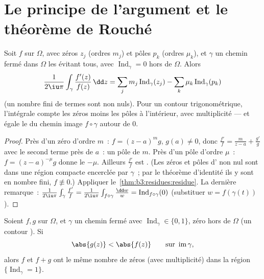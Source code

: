 \section{Le principe de l'argument et le théorème de Rouché}

\begin{theorem}
\label{thm:b3:residues:argument}
Soit $f$  sur $\Omega$, avec zéros $z_j$ (ordres
$m_j$) et pôles $p_k$ (ordres $\mu_k$), et $\gamma$ un chemin
fermé dans $\Omega$ les évitant tous, avec
$\operatorname{Ind}_\gamma = 0$ hors de $\Omega$. Alors
\[
\frac1{2\iu\pi}\int_\gamma\frac{f'(z)}{f(z)}\,\dd z
= \sum_j m_j\operatorname{Ind}_\gamma(z_j)
- \sum_k \mu_k\operatorname{Ind}_\gamma(p_k)
\]
(un nombre fini de termes sont non nuls). Pour un contour
 trigonométrique, l'intégrale compte les zéros moins
les pôles à l'intérieur, avec multiplicité --- et égale le
 du chemin image $f\circ\gamma$ autour de $0$.
\end{theorem}

\begin{proof}
Près d'un zéro d'ordre $m$~: $f = (z-a)^mg$, $g(a) \neq 0$,
donc $\frac{f'}f = \frac m{z - a} + \frac{g'}g$ avec le
second terme  près de $a$~: un pôle  de
 $m$. Près d'un pôle d'ordre $\mu$~: $f =
(z-a)^{-\mu}g$ donne le  $-\mu$. Ailleurs $\frac{f'}f$
est . (Les zéros et pôles d' non nul sont
dans une région compacte encerclée par $\gamma$~; par le
théorème d'identité ils y sont en nombre fini, $f \not\equiv
0$.) Appliquer le~\cref{thm:b3:residues:residue}. La dernière
remarque~: $\frac1{2\iu\pi}\int_\gamma\frac{f'}f =
\frac1{2\iu\pi}\int_{f\circ\gamma}\frac{\dd w}w =
\operatorname{Ind}_{f\circ\gamma}(0)$ (substituer $w =
f(\gamma(t))$).
\end{proof}

\begin{theorem}[Rouché]\label{thm:b3:residues:rouche}
Soient $f, g$  sur $\Omega$, et $\gamma$ un chemin
fermé avec $\operatorname{Ind}_\gamma \in \{0,1\}$, zéro hors
de $\Omega$ (un contour ). Si
\[
\abs{g(z)} < \abs{f(z)} \qquad \text{sur }
\operatorname{im}\gamma,
\]
alors $f$ et $f + g$ ont le même nombre de zéros (avec
multiplicité) dans la région $\{\operatorname{Ind}_\gamma =
1\}$.
\end{theorem}

